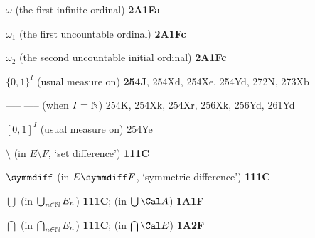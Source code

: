 \indexmedskip
\indexheader{$\scriptstyle\pmb{\omega}$}

$\omega$ (the first infinite ordinal) {\bf 2A1Fa}






$\omega_1$ (the first uncountable ordinal) {\bf 2A1Fc}















$\omega_2$ (the second uncountable initial ordinal)
{\bf 2A1Fc}














\indexmedskip

$\{0,1\}^I$ (usual measure on) {\bf 254J}, 254Xd, 254Xe, 254Yd,
272N, 273Xb 




----- ----- (when $I=\Bbb N$) 254K, 254Xk, 254Xr, 256Xk, 256Yd,
261Yd 














$[0,1]^I$ (usual measure on) 254Ye


















\indexmedskip
{}

$\setminus$ (in $E\setminus F$, `set difference') {\bf 111C}

$\symmdiff$ (in $E\symmdiff F$, `symmetric difference') {\bf 111C}







$\bigcup$ (in $\bigcup_{n\in\Bbb N}E_n$) {\bf 111C};
  (in $\bigcup\Cal A$) {\bf 1A1F}

$\bigcap$ (in $\bigcap_{n\in\Bbb N}E_n$) {\bf 111C};
  (in $\bigcap\Cal E$) {\bf 1A2F}

